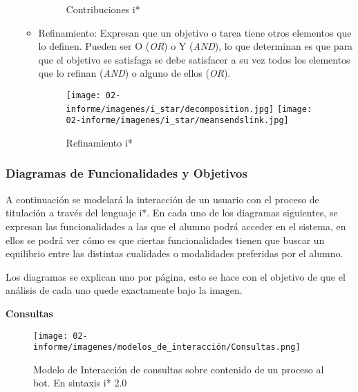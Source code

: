 \begin{itemize}
\begin{itemize}
\begin{figure}[h!]
                \caption{Contribuciones \gls{i*}}
                \label{fig:my_label}
            \end{figure}
            \item Refinamiento: Expresan que un objetivo o tarea tiene otros elementos que lo definen. Pueden ser O (\textit{OR}) o Y (\textit{AND}), lo que determinan es que para que el objetivo se satisfaga se debe satisfacer a su vez todos los elementos que lo refinan (\textit{AND}) o alguno de ellos (\textit{OR}).
            \begin{figure}[h!]
                \centering
                \texttt{[image: 02-informe/imagenes/i\_star/decomposition.jpg]}
                \texttt{[image: 02-informe/imagenes/i\_star/meansendslink.jpg]}
                \caption{Refinamiento \gls{i*}}
                \label{fig:my_label}
            \end{figure}
                    
        \end{itemize}
    \end{itemize}
    
    \newpage
    \subsubsection{Diagramas de Funcionalidades y Objetivos}
    \label{sssec:diagramas}
    
    \par A continuación se modelará la interacción de un usuario con el proceso de titulación a través del lenguaje \gls{i*}. En cada uno de los diagramas siguientes, se expresan las funcionalidades a las que el alumno podrá acceder en el sistema, en ellos se podrá ver cómo es que ciertas funcionalidades tienen que buscar un equilibrio entre las distintas cualidades o modalidades preferidas por el alumno.
    \par Los diagramas se explican uno por página, esto se hace con el objetivo de que el análisis de cada uno quede exactamente bajo la imagen.
    
    \newpage
    \par \textbf{Consultas}
    \begin{figure}[h!]
        \centering
        \texttt{[image: 02-informe/imagenes/modelos\_de\_interacción/Consultas.png]}
        \caption{Modelo de Interacción de consultas sobre contenido de un proceso al bot. En sintaxis i* 2.0}
        \label{fig:consultas}
    \end{figure}
     
